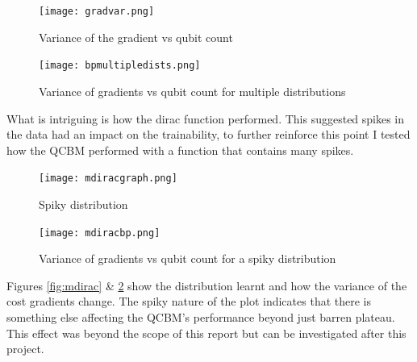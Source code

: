 \documentclass[12pt]{article}
\numberwithin{equation}{section}
\begin{document}
\begin{figure}[h!]
    \centering
    \begin{minipage}{0.48\textwidth}
        \centering
        \texttt{[image: gradvar.png]}
        \caption{Variance of the gradient vs qubit count}
        \label{fig:gradvar}
    \end{minipage}
    \hfill
    \begin{minipage}{0.48\textwidth}
        \centering
        \texttt{[image: bpmultipledists.png]}
        \caption{Variance of gradients vs qubit count for multiple distributions}
        \label{fig:bpmultiple}
    \end{minipage}
\end{figure}
What is intriguing is how the dirac function performed. This suggested spikes in 
the data had an impact on the trainability, to further reinforce this point I 
tested how the QCBM performed with a function that contains many spikes. 
\begin{figure}[h!]
    \centering
    \begin{minipage}{0.48\textwidth}
        \centering
        \texttt{[image: mdiracgraph.png]}
        \caption{Spiky distribution}
        \label{fig:mdirac}
    \end{minipage}
    \hfill
    \begin{minipage}{0.48\textwidth}
        \centering
        \texttt{[image: mdiracbp.png]}
        \caption{Variance of gradients vs qubit count for a spiky distribution}
        \label{fig:bpdirac}
    \end{minipage}
\end{figure}
Figures \ref{fig:mdirac} \& \ref{fig:bpdirac} show the distribution learnt and 
how the variance of the cost gradients change. The spiky nature of the plot 
indicates that there is something else affecting the QCBM's performance beyond 
just barren plateau. This effect was beyond the scope of this report but can be 
investigated after this project. 
\end{document}
